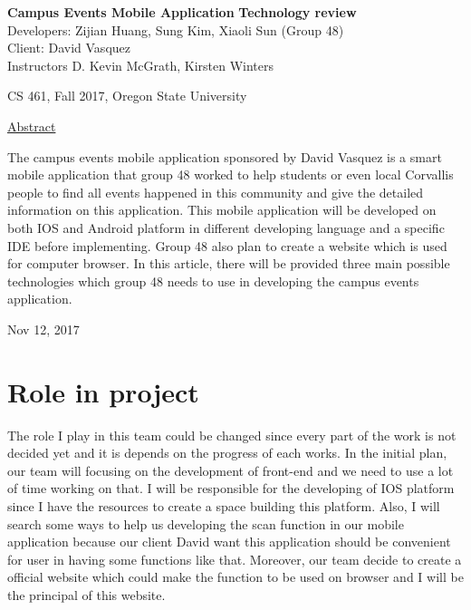 \documentclass[letterpaper, 10pt,titlepage]{article}
\begin{document}
\begin{titlepage}
\begin{center}
    \Huge
    \textbf{Campus Events Mobile Application}
    \textbf{Technology review}\\
    \vspace{1.0cm}
    \large
    Developers: Zijian Huang, Sung Kim, Xiaoli Sun (Group 48)\\
    Client: David Vasquez\\
    \vspace{1.5cm}
    \large
    Instructors D. Kevin McGrath, Kirsten Winters

    \large
    CS 461, Fall 2017, Oregon State University\\    

    \vspace{3.2cm}

    \large
    \underline{Abstract}\\
    \vspace{0.3cm}
    \end{center}
    \large

The campus events mobile application sponsored by David Vasquez is a smart mobile application that group 48 worked to help students or even local Corvallis people to find all events happened in this community and give the detailed information on this application. This mobile application will be developed on both IOS and Android platform in different developing language and a specific IDE before implementing. Group 48 also plan to create a website which is used for computer browser. In this article, there will be provided three main possible technologies which group 48 needs to use in developing the campus events application.
    
    \vspace{0.8cm}
    \vfill
    
\begin{center}    
    Nov 12, 2017

\end{center}
\end{titlepage}


\tableofcontents
\newpage



\section{Role in project}
The role I play in this team could be changed since every part of the work is not decided yet and it is depends on the progress of each works. In the initial plan, our team will focusing on the development of front-end and we need to use a lot of time working on that. I will be responsible for the developing of IOS platform since I have the resources to create a space building this platform. Also, I will search some ways to help us developing the scan function in our mobile application because our client David want this application should be convenient for user in having some functions like that. Moreover, our team decide to create a official website which could make the function to be used on browser and I will be the principal of this website.
\end{document}
